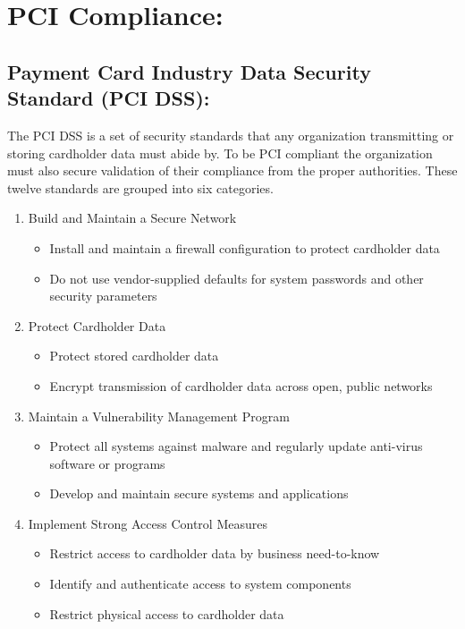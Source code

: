\documentclass[letterpaper]{article}
\begin{document}
  \section{PCI Compliance:}
    \subsection{Payment Card Industry Data Security Standard (PCI DSS):}
      The PCI DSS is a set of security standards that any organization transmitting or storing
      cardholder data must abide by. To be PCI compliant the organization must also secure validation
      of their compliance from the proper authorities.
      These twelve standards are grouped into six categories.
      \begin{enumerate}
        \item Build and Maintain a Secure Network
          \begin{itemize}
            \item Install and maintain a firewall configuration to protect cardholder data
            \item  Do not use vendor-supplied defaults for system passwords and other
security parameters
          \end{itemize}
        \item Protect Cardholder Data
          \begin{itemize}
            \item Protect stored cardholder data
            \item Encrypt transmission of cardholder data across open, public networks
          \end{itemize}
        \item Maintain a Vulnerability Management Program
          \begin{itemize}
            \item Protect all systems against malware and regularly update anti-virus
software or programs
            \item Develop and maintain secure systems and applications
          \end{itemize}
        \item Implement Strong Access Control Measures
          \begin{itemize}
            \item Restrict access to cardholder data by business need-to-know
            \item Identify and authenticate access to system components
            \item Restrict physical access to cardholder data

\end{itemize}
\end{enumerate}
\end{document}
